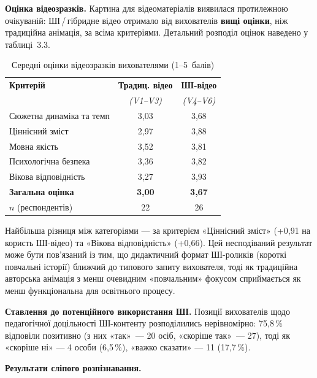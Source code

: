 \documentclass[14pt, a4paper]{extreport}
\begin{document}
\textbf{Оцінка відеозразків.} Картина для відеоматеріалів виявилася протилежною очікуваній: ШІ\,/\,гібридне відео отримало від вихователів \textbf{вищі оцінки}, ніж традиційна анімація, за всіма критеріями. Детальний розподіл оцінок наведено у таблиці~3.3.

\begin{table}[htbp]
\caption{Середні оцінки відеозразків вихователями (1--5~балів)}
\centering
\begin{tabular}{|l|c|c|}
\hline
\rowcolor{tblhead}\textbf{Критерій} & \textbf{Традиц. відео} & \textbf{ШІ-відео} \\
\rowcolor{tblhead} & \textit{(V1--V3)} & \textit{(V4--V6)} \\
\hline
Сюжетна динаміка та темп  & 3{,}03 & 3{,}68 \\
Ціннісний зміст            & 2{,}97 & 3{,}88 \\
Мовна якість               & 3{,}52 & 3{,}81 \\
Психологічна безпека       & 3{,}36 & 3{,}82 \\
Вікова відповідність       & 3{,}27 & 3{,}93 \\
\textbf{Загальна оцінка}   & \textbf{3{,}00} & \textbf{3{,}67} \\
\hline
$n$ (респондентів) & 22 & 26 \\
\hline
\end{tabular}
\end{table}

Найбільша різниця між категоріями --- за критерієм «Ціннісний зміст» (+0{,}91 на користь ШІ-відео) та «Вікова відповідність» (+0{,}66). Цей несподіваний результат може бути пов'язаний із тим, що дидактичний формат ШІ-роликів (короткі повчальні історії) ближчий до типового запиту вихователя, тоді як традиційна авторська анімація з менш очевидним «повчальним» фокусом сприймається як менш функціональна для освітнього процесу.

\textbf{Ставлення до потенційного використання ШІ.} Позиції вихователів щодо педагогічної доцільності ШІ-контенту розподілились нерівномірно: 75{,}8\,\% відповіли позитивно (з них «так»~--- 20 осіб, «скоріше так»~--- 27), тоді як «скоріше ні» --- 4 особи (6{,}5\,\%), «важко сказати» --- 11 (17{,}7\,\%).

\textbf{Результати сліпого розпізнавання.}
\end{document}
